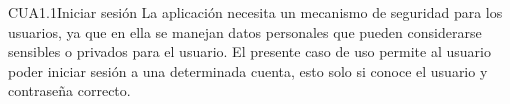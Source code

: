 
\begin{UseCase}{CUA1.1}{Iniciar sesión}
    {
	La aplicación necesita un mecanismo de seguridad para los usuarios, ya que en ella se manejan datos personales que pueden considerarse sensibles o privados para el usuario. El presente caso de uso permite al usuario poder iniciar sesión a una determinada cuenta, esto solo si conoce el usuario y contraseña correcto. 
    }

\end{UseCase}
